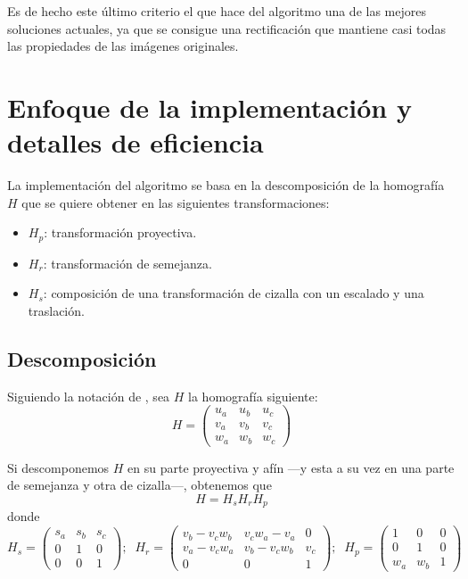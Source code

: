 \documentclass[a4paper, 11pt]{article}
\theoremstyle{definition}
\begin{document}
    Es de hecho este último criterio el que hace del algoritmo una de las mejores soluciones actuales, ya que se consigue una rectificación que mantiene casi todas las propiedades de las imágenes originales.


    \section{Enfoque de la implementación y detalles de eficiencia}

    La implementación del algoritmo se basa en la descomposición de la homografía $H$ que se quiere obtener en las siguientes transformaciones:
    \begin{itemize}
        \item $H_p$: transformación proyectiva.
        \item $H_r$: transformación de semejanza.
        \item $H_s$: composición de una transformación de cizalla con un escalado y una traslación.
    \end{itemize}

    \subsection{Descomposición}
    Siguiendo la notación de \cite{LoopZhang}, sea $H$ la homografía siguiente:
    \[
    H =
    \begin{pmatrix}
        u_a & u_b & u_c \\
        v_a & v_b & v_c \\
        w_a & w_b & w_c
    \end{pmatrix}
    \]

    Si descomponemos $H$ en su parte proyectiva y afín ---y esta a su vez en una parte de semejanza y otra de cizalla---, obtenemos que
    \[
    H = H_s H_r H_p
    \]
    donde
    \[
    H_s =
    \begin{pmatrix}
        s_a & s_b & s_c \\
        0 & 1 & 0 \\
        0 & 0 & 1
    \end{pmatrix};\;\;
    H_r =
    \begin{pmatrix}
        v_b - v_c w_b & v_c w_a - v_a & 0 \\
        v_a - v_c w_a & v_b - v_c w_b & v_c \\
        0 & 0 & 1
    \end{pmatrix};\;\;
    H_p =
    \begin{pmatrix}
        1 & 0 & 0 \\
        0 & 1 & 0 \\
        w_a & w_b & 1
    \end{pmatrix}
    \]
\end{document}

